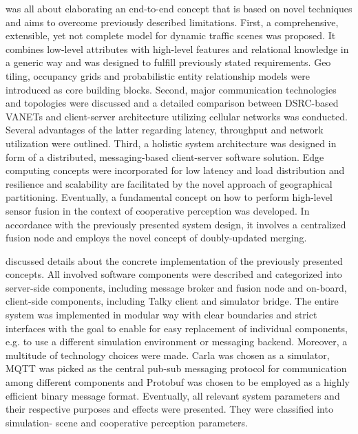  was all about elaborating an end-to-end concept that is based on novel techniques and aims to overcome previously described limitations. First, a comprehensive, extensible, yet not complete model for dynamic traffic scenes was proposed. It combines low-level attributes with high-level features and relational knowledge in a generic way and was designed to fulfill previously stated requirements. Geo tiling, occupancy grids and probabilistic entity relationship models were introduced as core building blocks.
Second, major communication technologies and topologies were discussed and a detailed comparison between DSRC-based VANETs and client-server architecture utilizing cellular networks was conducted. Several advantages of the latter regarding latency, throughput and network utilization were outlined.
Third, a holistic system architecture was designed in form of a distributed, messaging-based client-server software solution. Edge computing concepts were incorporated for low latency and load distribution and resilience and scalability are facilitated by the novel approach of geographical partitioning.
Eventually, a fundamental concept on how to perform high-level sensor fusion in the context of cooperative perception was developed. In accordance with the previously presented system design, it involves a centralized fusion node and employs the novel concept of doubly-updated merging. 
\par
\bigskip

 discussed details about the concrete implementation of the previously presented concepts. All involved software components were described and categorized into server-side components, including message broker and fusion node and on-board, client-side components, including Talky client and simulator bridge. The entire system was implemented in modular way with clear boundaries and strict interfaces with the goal to enable for easy replacement of individual components, e.g. to use a different simulation environment or messaging backend. Moreover, a multitude of technology choices were made. Carla was chosen as a simulator, MQTT was picked as the central pub-sub messaging protocol for communication among different components and Protobuf was chosen to be employed as a highly efficient binary message format. Eventually, all relevant system parameters and their respective purposes and effects were presented. They were classified into simulation- scene and cooperative perception parameters. 
\par
\bigskip

